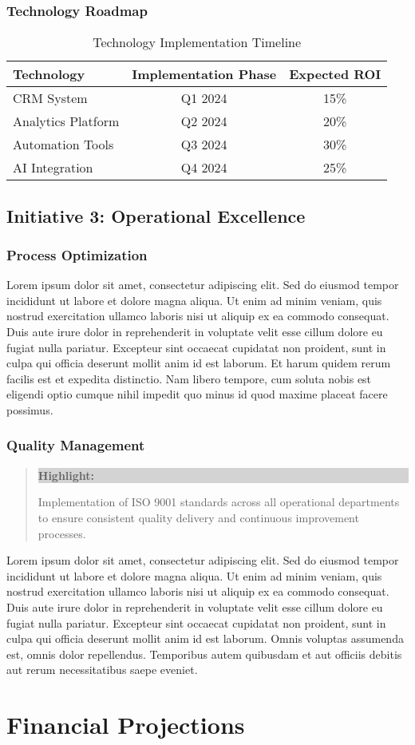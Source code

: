 \documentclass[11pt,a4paper]{article}
\newcommand{\loremtext}[1]{%
  Lorem ipsum dolor sit amet, consectetur adipiscing elit. Sed do eiusmod tempor incididunt ut labore et dolore magna aliqua. Ut enim ad minim veniam, quis nostrud exercitation ullamco laboris nisi ut aliquip ex ea commodo consequat. Duis aute irure dolor in reprehenderit in voluptate velit esse cillum dolore eu fugiat nulla pariatur. Excepteur sint occaecat cupidatat non proident, sunt in culpa qui officia deserunt mollit anim id est laborum.%
}
\newenvironment{highlight}%
{\begin{quote}\colorbox{lightgray}{\parbox{\dimexpr\linewidth-2\fboxsep}{\textbf{Highlight:} }}}%
{\end{quote}}
\begin{document}
\subsubsection{Technology Roadmap}
\begin{table}[h]
\centering
\begin{tabular}{|l|c|c|}
\hline
\textbf{Technology} & \textbf{Implementation Phase} & \textbf{Expected ROI} \\
\hline
CRM System & Q1 2024 & 15\% \\
\hline
Analytics Platform & Q2 2024 & 20\% \\
\hline
Automation Tools & Q3 2024 & 30\% \\
\hline
AI Integration & Q4 2024 & 25\% \\
\hline
\end{tabular}
\caption{Technology Implementation Timeline}
\end{table}

\subsection{Initiative 3: Operational Excellence}

\subsubsection{Process Optimization}
\loremtext{10} Et harum quidem rerum facilis est et expedita distinctio. Nam libero tempore, cum soluta nobis est eligendi optio cumque nihil impedit quo minus id quod maxime placeat facere possimus.

\subsubsection{Quality Management}
\begin{highlight}
Implementation of ISO 9001 standards across all operational departments to ensure consistent quality delivery and continuous improvement processes.
\end{highlight}

\loremtext{11} Omnis voluptas assumenda est, omnis dolor repellendus. Temporibus autem quibusdam et aut officiis debitis aut rerum necessitatibus saepe eveniet.

\section{Financial Projections}
\end{document}
